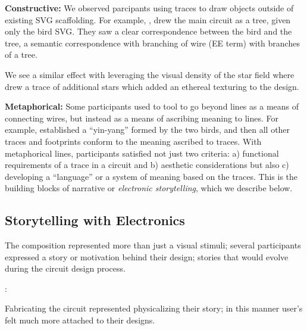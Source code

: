 \documentclass{sigchi}
\begin{document}
  \textbf{Constructive:} We observed parcipants using traces to draw objects outside of existing SVG scaffolding. For example, , drew the main circuit as a tree, given only the bird SVG. They saw a clear correspondence between the bird and the tree, a semantic correspondence with branching of wire (EE term) with branches of a tree.
  
  
  We see a similar effect with leveraging the visual density of the star field where  drew a trace of additional stars which added an ethereal texturing to the design.
  
  \textbf{Metaphorical:} Some participants used to tool to go beyond lines as a means of connecting wires, but instead as a means of ascribing meaning to lines. For example,  established a ``yin-yang'' formed by the two birds, and then all other traces and footprints conform to the meaning ascribed to traces. With metaphorical lines, participants satisfied not just two criteria: a) functional requirements of a trace in a circuit and b) aesthetic considerations but also c) developing a ``language'' or a system of meaning based on the traces.
  This is the building blocks of narrative or \textit{electronic storytelling}, which we describe below.

\subsection{Storytelling with Electronics}
  The composition represented more than just a visual stimuli; several participants expressed a story or motivation behind their design; stories that would evolve during the circuit design process.
  \begin{myquote}
   \vspace{-2pt}
    :
    \vspace{-2pt}
  \end{myquote}
  Fabricating the circuit represented physicalizing their story; in this manner user's felt much more attached to their designs.
  
\end{document}
